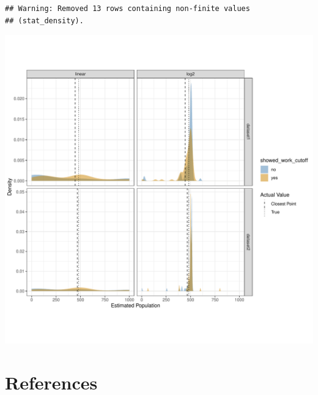 \documentclass[print]{nuthesis}
\begin{document}
\begin{verbatim}
## Warning: Removed 13 rows containing non-finite values
## (stat_density).
\end{verbatim}

\begin{center}\includegraphics[width=\linewidth,]{thesis_files/figure-latex/unnamed-chunk-2-1} \end{center}

\backmatter

\hypertarget{references}{%
\chapter*{References}\label{references}}

\noindent

\setlength{\parindent}{-0.20in}
\setlength{\leftskip}{0.20in}
\setlength{\parskip}{8pt}
\end{document}
